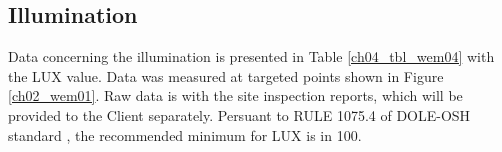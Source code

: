 \subsection{Illumination}\label{aq03}

Data concerning the illumination is presented in Table \ref{ch04_tbl_wem04} with the LUX value. Data was measured at targeted points shown in Figure \ref{ch02_wem01}. Raw data is with the site inspection reports, which will be provided to the Client separately. Persuant to RULE 1075.4 of DOLE-OSH standard \cite{DOLE2016}, the recommended minimum for LUX is in 100.


